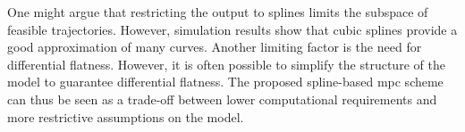 One might argue that restricting the output to splines limits the subspace of feasible trajectories.
However, simulation results show that cubic splines provide a good approximation of many curves.
Another limiting factor is the need for differential flatness.
However, it is often possible to simplify the structure of the model to guarantee differential flatness.        
The proposed spline-based \gls{mpc} scheme can thus be seen as a trade-off between lower computational requirements and more restrictive assumptions on the model.
